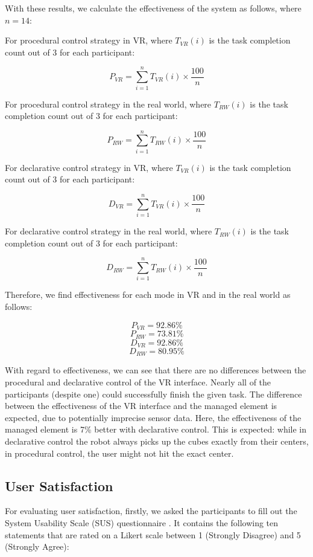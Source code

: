 \documentclass[10pt, conference]{IEEEtran}
\begin{document}
With these results, we calculate the effectiveness of the system as follows, where \(n=14\):

For procedural control strategy in VR, where \(T_{VR}(i)\) is the task completion count out of 3 for each participant:

\[
P_{VR} =
\sum\limits_{i=1}^n T_{VR}(i)\times {\dfrac{100}{n}}
\]

For procedural control strategy in the real world, where \(T_{RW}(i)\) is the task completion count out of 3 for each participant:

\[
P_{RW} =
\sum\limits_{i=1}^n T_{RW}(i)\times {\dfrac{100}{n}}
\]

For declarative control strategy in VR, where \(T_{VR}(i)\) is the task completion count out of 3 for each participant:

\[
D_{VR} =
\sum\limits_{i=1}^n T_{VR}(i)\times {\dfrac{100}{n}}
\]

For declarative control strategy in the real world, where \(T_{RW}(i)\) is the task completion count out of 3 for each participant:

\[
D_{RW} =
\sum\limits_{i=1}^n T_{RW}(i)\times {\dfrac{100}{n}}
\]

Therefore, we find effectiveness for each mode in VR and in the real world as follows:

\[P_{VR} = 92.86\%\] \[P_{RW} = 73.81\%\]
\[D_{VR} = 92.86\%\] \[D_{RW} = 80.95\%\]

With regard to effectiveness, we can see that there are no differences between the procedural and declarative control of the VR interface. Nearly all of the participants (despite one) could successfully finish the given task. The difference between the effectiveness of the VR interface and the managed element is expected, due to potentially imprecise sensor data. Here, the effectiveness of the managed element is 7\% better with declarative control. This is expected: while in declarative control the robot always picks up the cubes exactly from their centers, in procedural control, the user might not hit the exact center.

\subsection{User Satisfaction}
\label{evalSatisfaction}

For evaluating user satisfaction, firstly, we asked the participants to fill out the System Usability Scale (SUS) questionnaire \cite{sus_questionnaire}. It contains the following ten statements that are rated on a Likert scale between 1 (Strongly Disagree) and 5 (Strongly Agree): 
\end{document}

